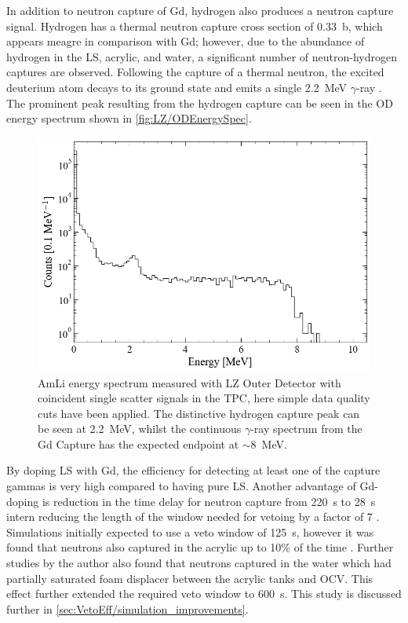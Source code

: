 In addition to neutron capture of Gd, hydrogen also produces a neutron capture signal. Hydrogen has a thermal neutron capture cross section of 0.33~b, which appears meagre in comparison with Gd; however, due to the abundance of hydrogen in the LS, acrylic, and water, a significant number of neutron-hydrogen captures are observed. Following the capture of a thermal neutron, the excited deuterium atom decays to its ground state and emits a single 2.2~MeV $\gamma$-ray \cite{LZTDR}. The prominent peak resulting from the hydrogen capture can be seen in the OD energy spectrum shown in \autoref{fig:LZ/ODEnergySpec}.

\begin{figure}[!h]
    \centering
    \includegraphics[width=0.7\linewidth]{figures/LZ/ODEnergySpec.png}
    \caption[AmLi energy spectrum measured with LZ Outer Detector with coincident single scatter signals in the TPC]{AmLi energy spectrum measured with LZ Outer Detector with coincident single scatter signals in the TPC, here simple data quality cuts have been applied. The distinctive hydrogen capture peak can be seen at 2.2~MeV, whilst the continuous $\gamma$-ray spectrum from the Gd Capture has the expected endpoint at $\mathtt{\sim}$8~MeV.}
    \label{fig:LZ/ODEnergySpec}
\end{figure}


By doping LS with Gd, the efficiency for detecting at least one of the capture gammas is very high compared to having pure LS. Another advantage of Gd-doping is reduction in the time delay for neutron capture from 220~\textmu s to 28~\textmu s intern reducing the length of the window needed for vetoing by a factor of 7 \cite{LZTDR}. Simulations initially expected to use a veto window of 125~\textmu s, however it was found that neutrons also captured in the acrylic up to 10\% of the time \cite{LZTDR}. Further studies by the author also found that neutrons captured in the water which had partially saturated foam displacer between the acrylic tanks and OCV. This effect further extended the required veto window to 600~\textmu s. This study is discussed further in \autoref{sec:VetoEff/simulation_improvements}.

